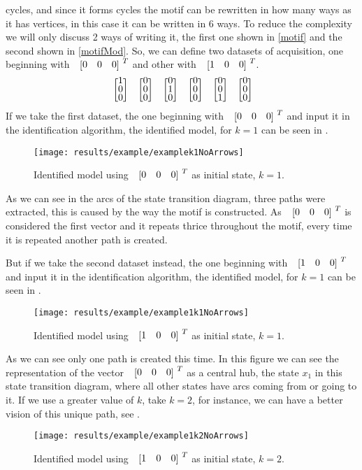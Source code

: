 cycles, and since it forms cycles the motif can be rewritten in how many ways as
it has vertices, in this case it can be written in 6 ways. To reduce the
complexity we will only discuss 2 ways of writing it, the first one shown in
\ref{motif} and the second shown in \ref{motifMod}. So, we can define two datasets of acquisition,
one beginning with $\colvec{0&0&0}^T$ and other with $\colvec{1&0&0}^T$.
\begin{align}
  \label{motifMod}
\colvec{1\\0\\0}\colvec{0\\0\\0}\colvec{0\\1\\0}\colvec{0\\0\\0}\colvec{0\\0\\1}\colvec{0\\0\\0}
\end{align}
If we take the first dataset, the one beginning with $\colvec{0&0&0}^T$ and
input it in the identification algorithm, the identified model, for $k=1$ can be
seen in . 
\begin{figure}[H]
  \centering
 \texttt{[image: results/example/examplek1NoArrows]}
  \caption{Identified model using $\colvec{0&0&0}^T$ as initial state, $k=1$.}
    \label{fig:exampleCol000k1}
\end{figure}
As we can see in the arcs of the state transition diagram, three paths were
extracted, this is caused by the way the motif is constructed. As
$\colvec{0&0&0}^T$ is considered the first vector and it repeats thrice
throughout the motif, every time it is repeated another path is created.

But if we take the second dataset instead, the one beginning with $\colvec{1&0&0}^T$ and
input it in the identification algorithm, the identified model, for $k=1$ can be
seen in . 
\begin{figure}[H]
  \centering
  \texttt{[image: results/example/example1k1NoArrows]}
  \caption{Identified model using $\colvec{1&0&0}^T$ as initial state, $k=1$.}
    \label{fig:exampleCol100k1}
\end{figure}
As we can see only one path is created this time. In this figure we can see the
representation of the vector $\colvec{0&0&0}^T$ as a central hub, the state
$x_1$ in this state transition diagram, where all other states have arcs coming
from or going to it. If we use a greater value of $k$, take $k=2$, for instance, we can have a
better vision of this unique path, see .
\begin{figure}[H]
  \centering
  \texttt{[image: results/example/example1k2NoArrows]}
  \caption{Identified model using $\colvec{1&0&0}^T$ as initial state, $k=2$.}
    \label{fig:exampleCol100k2}
  \end{figure}

